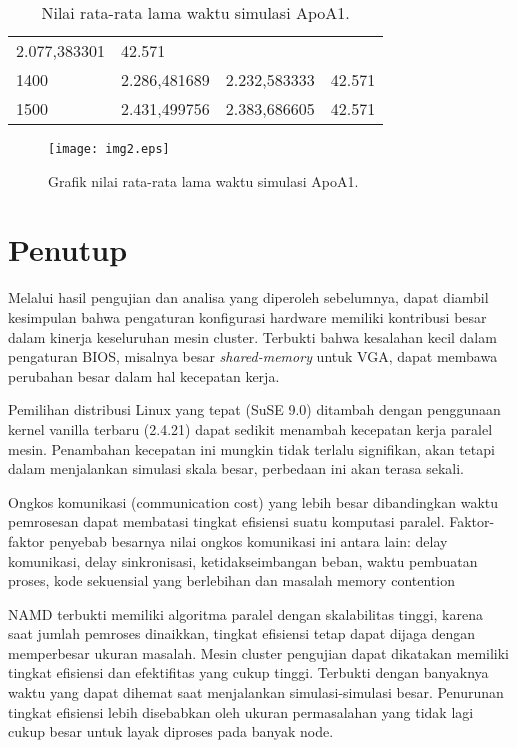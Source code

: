 \documentclass[aps,showpacs,pre,floatfix]{revtex4}
\begin{document}
\begin{table}
\begin{tabular}{|p{65pt}|p{91pt}|p{91pt}|p{91pt}|}
{{\scriptsize 2.077,383301}
} & \parbox{91pt}{\raggedleft
{\scriptsize 42.571}
} \\
\parbox{65pt}{\centering
{\scriptsize 1400}
} & \parbox{91pt}{\raggedleft
{\scriptsize 2.286,481689}
} & \parbox{91pt}{\raggedleft
{\scriptsize 2.232,583333}
} & \parbox{91pt}{\raggedleft
{\scriptsize 42.571}
} \\
\parbox{65pt}{\centering
{\scriptsize 1500}
} & \parbox{91pt}{\raggedleft
{\scriptsize 2.431,499756}
} & \parbox{91pt}{\raggedleft
{\scriptsize 2.383,686605}
} & \parbox{91pt}{\raggedleft
{\scriptsize 42.571}
} \\
\hline
\end{tabular}
\caption{Nilai rata-rata lama waktu simulasi ApoA1.}\label{T5}
\end{table}

\begin{figure}
\texttt{[image: img2.eps]}\\
  \caption{Grafik nilai rata-rata lama waktu
simulasi ApoA1.}\label{g3}
\end{figure}



\section{Penutup}

Melalui hasil pengujian dan analisa yang diperoleh sebelumnya,
dapat diambil kesimpulan bahwa pengaturan konfigurasi hardware
memiliki kontribusi besar dalam kinerja keseluruhan mesin cluster.
Terbukti bahwa kesalahan kecil dalam pengaturan BIOS, misalnya
besar \textit{shared-memory }untuk VGA, dapat membawa perubahan
besar dalam hal kecepatan kerja.

Pemilihan distribusi Linux yang tepat (SuSE 9.0) ditambah dengan
penggunaan kernel vanilla terbaru (2.4.21) dapat sedikit menambah
kecepatan kerja paralel mesin. Penambahan kecepatan ini mungkin
tidak terlalu signifikan, akan tetapi dalam menjalankan simulasi
skala besar, perbedaan ini akan terasa sekali.

Ongkos komunikasi (communication cost) yang lebih besar
dibandingkan waktu pemrosesan dapat membatasi tingkat efisiensi
suatu komputasi paralel. Faktor-faktor penyebab besarnya nilai
ongkos komunikasi ini antara lain: delay komunikasi, delay
sinkronisasi, ketidakseimbangan beban, waktu pembuatan proses,
kode sekuensial yang berlebihan dan masalah memory contention

NAMD terbukti memiliki algoritma paralel dengan skalabilitas
tinggi, karena saat jumlah pemroses dinaikkan, tingkat efisiensi
tetap dapat dijaga dengan memperbesar ukuran masalah. Mesin
cluster pengujian dapat dikatakan memiliki tingkat efisiensi dan
efektifitas yang cukup tinggi. Terbukti dengan banyaknya waktu
yang dapat dihemat saat menjalankan simulasi-simulasi besar.
Penurunan tingkat efisiensi lebih disebabkan oleh ukuran
permasalahan yang tidak lagi cukup besar untuk layak diproses pada
banyak node.
\end{document}
